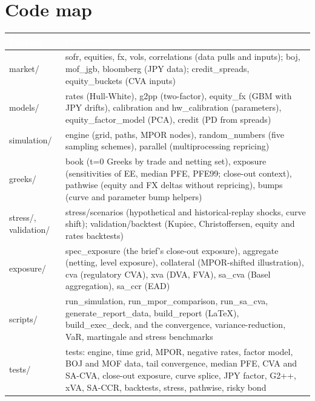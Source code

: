 \documentclass[11pt,letterpaper]{article}
\begin{document}
\section{Code map}
{\footnotesize\setlength{\LTpre}{4pt}\setlength{\LTpost}{6pt}
\begin{longtable}{>{\raggedright\arraybackslash}p{}>{\raggedright\arraybackslash}p{}}
\toprule
\rowcolor{navy}\textbf{\textcolor{white}{Package}} & \textbf{\textcolor{white}{Contents}} \\
\endhead
market/ & sofr, equities, fx, vols, correlations (data pulls and inputs); boj, mof\_jgb, bloomberg (JPY data); credit\_spreads, equity\_buckets (CVA inputs) \\
\rowcolor{gray!9}models/ & rates (Hull-White), g2pp (two-factor), equity\_fx (GBM with JPY drifts), calibration and hw\_calibration (parameters), equity\_factor\_model (PCA), credit (PD from spreads) \\
simulation/ & engine (grid, paths, MPOR nodes), random\_numbers (five sampling schemes), parallel (multiprocessing repricing) \\
\rowcolor{gray!9}greeks/ & book (t=0 Greeks by trade and netting set), exposure (sensitivities of EE, median PFE, PFE99; close-out context), pathwise (equity and FX deltas without repricing), bumps (curve and parameter bump helpers) \\
stress/, validation/ & stress/scenarios (hypothetical and historical-replay shocks, curve shift); validation/backtest (Kupiec, Christoffersen, equity and rates backtests) \\
\rowcolor{gray!9}exposure/ & spec\_exposure (the brief's close-out exposure), aggregate (netting, level exposure), collateral (MPOR-shifted illustration), cva (regulatory CVA), xva (DVA, FVA), sa\_cva (Basel aggregation), sa\_ccr (EAD) \\
scripts/ & run\_simulation, run\_mpor\_comparison, run\_sa\_cva, generate\_report\_data, build\_report (LaTeX), build\_exec\_deck, and the convergence, variance-reduction, VaR, martingale and stress benchmarks \\
\rowcolor{gray!9}tests/ & 168 tests: engine, time grid, MPOR, negative rates, factor model, BOJ and MOF data, tail convergence, median PFE, CVA and SA-CVA, close-out exposure, curve splice, JPY factor, G2++, xVA, SA-CCR, backtests, stress, pathwise, risky bond \\
\bottomrule
\end{longtable}}
\end{document}
